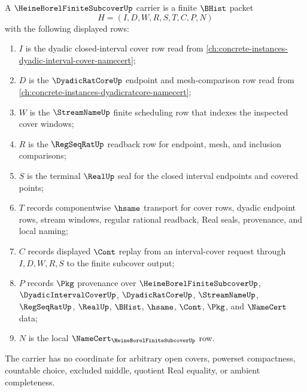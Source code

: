 \begin{definition}
\label{def:heine-borel-finite-subcover-carrier}
A $\HeineBorelFiniteSubcoverUp$ carrier is a finite $\BHist$ packet
$$
H=(I,D,W,R,S,T,C,P,N)
$$
with the following displayed rows:
\begin{enumerate}
\item $I$ is the dyadic closed-interval cover row read from \autoref{ch:concrete-instances-dyadic-interval-cover-namecert};
\item $D$ is the $\DyadicRatCoreUp$ endpoint and mesh-comparison row read from \autoref{ch:concrete-instances-dyadicratcore-namecert};
\item $W$ is the $\StreamNameUp$ finite scheduling row that indexes the inspected cover windows;
\item $R$ is the $\RegSeqRatUp$ readback row for endpoint, mesh, and inclusion comparisons;
\item $S$ is the terminal $\RealUp$ seal for the closed interval endpoints and covered points;
\item $T$ records componentwise $\hsame$ transport for cover rows, dyadic endpoint rows, stream windows, regular rational readback, Real seals, provenance, and local naming;
\item $C$ records displayed $\Cont$ replay from an interval-cover request through $I,D,W,R,S$ to the finite subcover output;
\item $P$ records $\Pkg$ provenance over $\HeineBorelFiniteSubcoverUp$, $\DyadicIntervalCoverUp$, $\DyadicRatCoreUp$, $\StreamNameUp$, $\RegSeqRatUp$, $\RealUp$, $\BHist$, $\hsame$, $\Cont$, $\Pkg$, and $\NameCert$ data;
\item $N$ is the local $\NameCert_{\HeineBorelFiniteSubcoverUp}$ row.
\end{enumerate}
The carrier has no coordinate for arbitrary open covers, powerset compactness, countable choice, excluded middle, quotient Real equality, or ambient completeness.
\end{definition}

